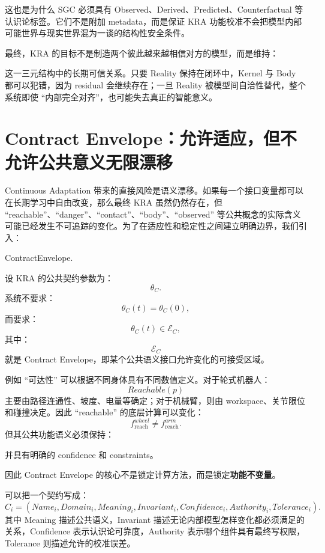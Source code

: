这也是为什么 SGC 必须具有 Observed、Derived、Predicted、Counterfactual 等认识论标签。它们不是附加 metadata，而是保证 KRA 功能校准不会把模型内部可能世界与现实世界混为一谈的结构性安全条件。

最终，KRA 的目标不是制造两个彼此越来越相信对方的模型，而是维持：
\begin{statementbox}
\centering
{}
\end{statementbox}
这一三元结构中的长期可信关系。只要 Reality 保持在闭环中，Kernel 与 Body 都可以犯错，因为 residual 会继续存在；一旦 Reality 被模型间自洽性替代，整个系统即使 ``内部完全对齐''，也可能失去真正的智能意义。

\section{Contract Envelope：允许适应，但不允许公共意义无限漂移}

Continuous Adaptation 带来的直接风险是语义漂移。如果每一个接口变量都可以在长期学习中自由改变，那么最终 KRA 虽然仍然存在，但 ``reachable''、``danger''、``contact''、``body''、``observed'' 等公共概念的实际含义可能已经发生不可追踪的变化。为了在适应性和稳定性之间建立明确边界，我们引入：
\begin{statementbox}
ContractEnvelope.
\end{statementbox}

设 KRA 的公共契约参数为：
\[
\theta_C.
\]
系统不要求：
\[
\theta_C(t)=\theta_C(0),
\]
而要求：
\[
\theta_C(t)\in\mathcal E_C,
\]
其中：
\[
\mathcal E_C
\]
就是 Contract Envelope，即某个公共语义接口允许变化的可接受区域。

例如 ``可达性'' 可以根据不同身体具有不同数值定义。对于轮式机器人：
\[
Reachable(p)
\]
主要由路径连通性、坡度、电量等确定；对于机械臂，则由 workspace、关节限位和碰撞决定。因此 ``reachable'' 的底层计算可以变化：
\[
f_{\text{reach}}^{wheel}
\neq
f_{\text{reach}}^{arm}.
\]
但其公共功能语义必须保持：
\begin{statementbox}
\centering
{}
\end{statementbox}
并具有明确的 confidence 和 constraints。

因此 Contract Envelope 的核心不是锁定计算方法，而是锁定\textbf{功能不变量}。

可以把一个契约写成：
\[
C_i
=
(
Name_i,
Domain_i,
Meaning_i,
Invariant_i,
Confidence_i,
Authority_i,
Tolerance_i
).
\]
其中 Meaning 描述公共语义，Invariant 描述无论内部模型怎样变化都必须满足的关系，Confidence 表示认识论可靠度，Authority 表示哪个组件具有最终写权限，Tolerance 则描述允许的校准误差。

